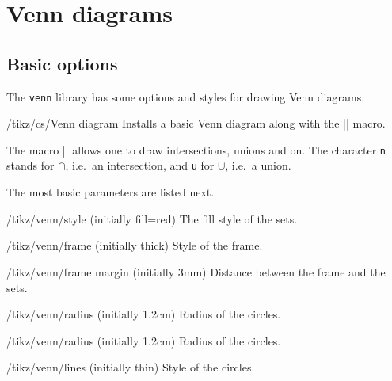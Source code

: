 \documentclass[a4paper]{ltxdoc}
\begin{document}
\section{Venn diagrams}
\begin{codeexample}
\usetikzlibrary{venn}
\end{codeexample}

\subsection{Basic options}
\label{sec:VennBasicOptions}

The \texttt{venn} library has some options and styles for drawing Venn diagrams.
\begin{key}{/tikz/cs/Venn diagram}
        Installs a basic Venn diagram along with the |\Venn| macro.
\end{key}

The macro |\Venn| allows one to draw intersections, unions and on. The character
\texttt{n} stands for $\cap$, i.e.\ an intersection, and \texttt{u} for $\cup$,
i.e.\ a union.

\begin{codeexample}[width=5cm]
\end{codeexample}

The most basic parameters are listed next.

\begin{key}{/tikz/venn/style (initially {fill=red})}
         The fill style of the sets.
\end{key}
\begin{key}{/tikz/venn/frame (initially {thick})}
         Style of the frame.
\end{key}
\begin{key}{/tikz/venn/frame margin (initially {3mm})}
         Distance between the frame and the sets.
\end{key}
\begin{key}{/tikz/venn/radius (initially {1.2cm})}
         Radius of the circles.
\end{key}
\begin{key}{/tikz/venn/radius (initially {1.2cm})}
         Radius of the circles.
\end{key}
\begin{key}{/tikz/venn/lines (initially {thin})}
         Style of the circles.
\end{key}
\end{document}
